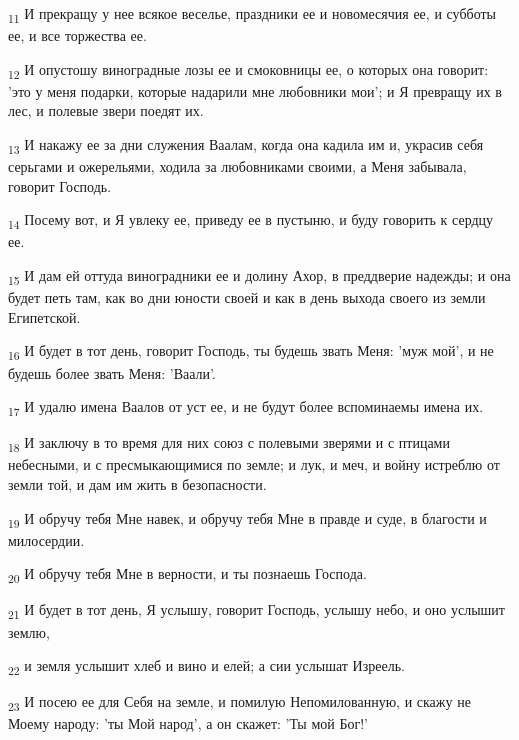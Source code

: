 \begin{tcolorbox}
\textsubscript{11} И прекращу у нее всякое веселье, праздники ее и новомесячия ее, и субботы ее, и все торжества ее.
\end{tcolorbox}
\begin{tcolorbox}
\textsubscript{12} И опустошу виноградные лозы ее и смоковницы ее, о которых она говорит: 'это у меня подарки, которые надарили мне любовники мои'; и Я превращу их в лес, и полевые звери поедят их.
\end{tcolorbox}
\begin{tcolorbox}
\textsubscript{13} И накажу ее за дни служения Ваалам, когда она кадила им и, украсив себя серьгами и ожерельями, ходила за любовниками своими, а Меня забывала, говорит Господь.
\end{tcolorbox}
\begin{tcolorbox}
\textsubscript{14} Посему вот, и Я увлеку ее, приведу ее в пустыню, и буду говорить к сердцу ее.
\end{tcolorbox}
\begin{tcolorbox}
\textsubscript{15} И дам ей оттуда виноградники ее и долину Ахор, в преддверие надежды; и она будет петь там, как во дни юности своей и как в день выхода своего из земли Египетской.
\end{tcolorbox}
\begin{tcolorbox}
\textsubscript{16} И будет в тот день, говорит Господь, ты будешь звать Меня: 'муж мой', и не будешь более звать Меня: 'Ваали'.
\end{tcolorbox}
\begin{tcolorbox}
\textsubscript{17} И удалю имена Ваалов от уст ее, и не будут более вспоминаемы имена их.
\end{tcolorbox}
\begin{tcolorbox}
\textsubscript{18} И заключу в то время для них союз с полевыми зверями и с птицами небесными, и с пресмыкающимися по земле; и лук, и меч, и войну истреблю от земли той, и дам им жить в безопасности.
\end{tcolorbox}
\begin{tcolorbox}
\textsubscript{19} И обручу тебя Мне навек, и обручу тебя Мне в правде и суде, в благости и милосердии.
\end{tcolorbox}
\begin{tcolorbox}
\textsubscript{20} И обручу тебя Мне в верности, и ты познаешь Господа.
\end{tcolorbox}
\begin{tcolorbox}
\textsubscript{21} И будет в тот день, Я услышу, говорит Господь, услышу небо, и оно услышит землю,
\end{tcolorbox}
\begin{tcolorbox}
\textsubscript{22} и земля услышит хлеб и вино и елей; а сии услышат Изреель.
\end{tcolorbox}
\begin{tcolorbox}
\textsubscript{23} И посею ее для Себя на земле, и помилую Непомилованную, и скажу не Моему народу: 'ты Мой народ', а он скажет: 'Ты мой Бог!'
\end{tcolorbox}
